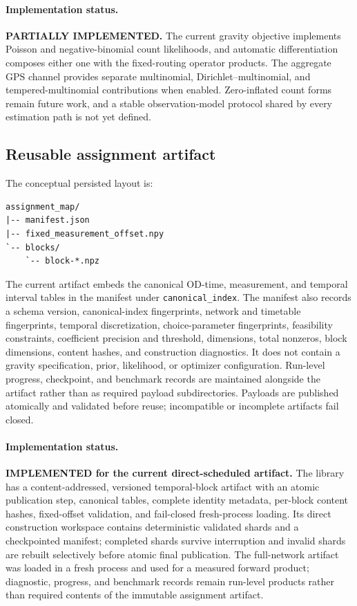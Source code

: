 \paragraph{Implementation status.}
\textbf{PARTIALLY IMPLEMENTED.}  The current gravity objective implements
Poisson and negative-binomial count likelihoods, and automatic differentiation
composes either one with the fixed-routing operator products.  The aggregate
GPS channel provides separate multinomial, Dirichlet--multinomial, and
tempered-multinomial contributions when enabled.  Zero-inflated count forms
remain future work, and a stable observation-model protocol shared by every
estimation path is not yet defined.

\subsection{Reusable assignment artifact}

The conceptual persisted layout is:
\begin{verbatim}
assignment_map/
|-- manifest.json
|-- fixed_measurement_offset.npy
`-- blocks/
    `-- block-*.npz
\end{verbatim}
The current artifact embeds the canonical OD-time, measurement, and temporal
interval tables in the manifest under \texttt{canonical\_index}.  The manifest also
records a schema version, canonical-index fingerprints, network and timetable
fingerprints, temporal discretization, choice-parameter fingerprints,
feasibility constraints, coefficient precision and threshold, dimensions,
total nonzeros, block dimensions, content hashes, and construction
diagnostics.  It does not contain a gravity specification, prior, likelihood,
or optimizer configuration.  Run-level progress, checkpoint, and benchmark
records are maintained alongside the artifact rather than as required payload
subdirectories.  Payloads are published atomically and validated before reuse;
incompatible or incomplete artifacts fail closed.

\paragraph{Implementation status.}
\textbf{IMPLEMENTED for the current direct-scheduled artifact.}  The library
has a content-addressed,
versioned temporal-block artifact with an atomic publication step, canonical
tables, complete identity metadata, per-block content hashes, fixed-offset
validation, and fail-closed fresh-process loading.  Its direct construction
workspace contains deterministic validated shards and a checkpointed manifest;
completed shards survive interruption and invalid shards are rebuilt
selectively before atomic final publication.  The full-network artifact was
loaded in a fresh process and used for a measured forward product; diagnostic,
progress, and benchmark records remain run-level products rather than required
contents of the immutable assignment artifact.

